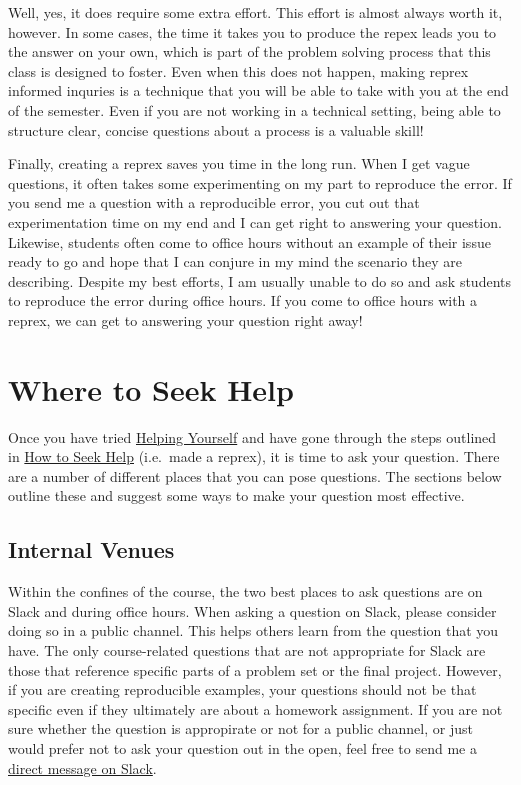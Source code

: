 \documentclass[]{book}
\theoremstyle{definition}
\theoremstyle{definition}
\theoremstyle{definition}
\theoremstyle{remark}
\begin{document}
Well, yes, it does require some extra effort. This effort is almost
always worth it, however. In some cases, the time it takes you to
produce the repex leads you to the answer on your own, which is part of
the problem solving process that this class is designed to foster. Even
when this does not happen, making reprex informed inquries is a
technique that you will be able to take with you at the end of the
semester. Even if you are not working in a technical setting, being able
to structure clear, concise questions about a process is a valuable
skill!

Finally, creating a reprex saves you time in the long run. When I get
vague questions, it often takes some experimenting on my part to
reproduce the error. If you send me a question with a reproducible
error, you cut out that experimentation time on my end and I can get
right to answering your question. Likewise, students often come to
office hours without an example of their issue ready to go and hope that
I can conjure in my mind the scenario they are describing. Despite my
best efforts, I am usually unable to do so and ask students to reproduce
the error during office hours. If you come to office hours with a
reprex, we can get to answering your question right away!

\section{Where to Seek Help}\label{where-to-seek-help}

Once you have tried \protect\hyperlink{helping-yourself}{Helping
Yourself} and have gone through the steps outlined in
\protect\hyperlink{how-to-seek-help}{How to Seek Help} (i.e.~made a
reprex), it is time to ask your question. There are a number of
different places that you can pose questions. The sections below outline
these and suggest some ways to make your question most effective.

\subsection{Internal Venues}\label{internal-venues}

Within the confines of the course, the two best places to ask questions
are on Slack and during office hours. When asking a question on Slack,
please consider doing so in a public channel. This helps others learn
from the question that you have. The only course-related questions that
are not appropriate for Slack are those that reference specific parts of
a problem set or the final project. However, if you are creating
reproducible examples, your questions should not be that specific even
if they ultimately are about a homework assignment. If you are not sure
whether the question is appropirate or not for a public channel, or just
would prefer not to ask your question out in the open, feel free to send
me a
\href{https://get.slack.help/hc/en-us/articles/212281468-Direct-messages-and-group-DMs}{direct
message on Slack}.
\end{document}
